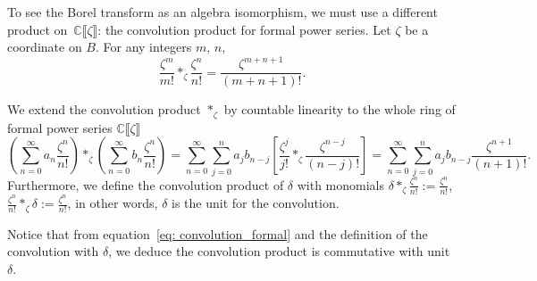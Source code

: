 \documentclass[pdftex]{sigma}
\newcommand{\C}{\mathbb{C}}
\numberwithin{equation}{section}
\begin{document}
To see the Borel transform as an algebra isomorphism, we must use a different product on~$\C\llbracket\zeta\rrbracket$: the convolution product for formal power series. Let $\zeta$ be a coordinate on $B$. For any integers $m$, $n$,
\begin{equation}\label{eq: convolution_formal}
\frac{\zeta^m}{m!} \ast_\zeta \frac{\zeta^n}{n!} = \frac{\zeta^{m+n+1}}{(m+n+1)!} .
\end{equation}
\begin{Definition}\label{def:convolution_formal}
We extend the convolution product $\ast_\zeta$ by countable linearity to the whole ring of formal power series $\C\llbracket\zeta\rrbracket$
\begin{equation*}
 \left( \sum_{n=0}^\infty a_n \frac{\zeta^n}{n!}\right)\ast_\zeta\left(\sum_{n=0}^\infty b_n\frac{\zeta^n}{n!}\right)=\sum_{n=0}^\infty\sum_{j=0}^na_jb_{n-j}\left[\frac{\zeta^j}{j!}\ast_\zeta\frac{\zeta^{n-j}}{(n-j)!}\right]=\sum_{n=0}^\infty\sum_{j=0}^na_jb_{n-j}\frac{\zeta^{n+1}}{(n+1)!}.
\end{equation*}
Furthermore, we define the convolution product of $\delta$ with monomials
$
\delta\ast_\zeta\frac{\zeta^n}{n!}:=\frac{\zeta^n}{n!}$, $
\frac{\zeta^n}{n!}\ast_\zeta\delta:=\frac{\zeta^n}{n!}$,
in other words, $\delta$ is the unit for the convolution.
\end{Definition}
Notice that from equation~\eqref{eq: convolution_formal} and the definition of the convolution with $\delta$, we deduce the convolution product is commutative with unit $\delta$.
\end{document}
